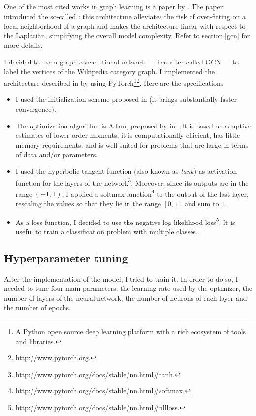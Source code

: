             One of the most cited works in graph learning is a paper by \citeauthor{Kipf} \cite{Kipf}. The paper introduced the so-called : this architecture alleviates the risk of over-fitting on a local neighborhood of a graph and makes the architecture linear with respect to the Laplacian, simplifying the overall model complexity. Refer to section \ref{gcn} for more details.
            
            I decided to use a graph convolutional network --- hereafter called GCN --- to label the vertices of the Wikipedia category graph. I implemented the architecture described in \cite{Kipf} by using PyTorch\footnote{A Python open source deep learning platform with a rich ecosystem of tools and libraries.}\footnote{\url{http://www.pytorch.org}.}. Here are the specifications:
            \begin{itemize}
                \item I used the initialization scheme proposed in \cite{Glorot} (it brings substantially faster convergence).
                \item The optimization algorithm is Adam, proposed by \citeauthor{Kingma} in \cite{Kingma}. It is based on adaptive estimates of lower-order moments, it is computationally efficient, has little memory requirements, and is well suited for problems that are large in terms of data and/or parameters.
                \item I used the hyperbolic tangent function (also known as \emph{tanh}) as activation function for the layers of the network\footnote{\url{http://www.pytorch.org/docs/stable/nn.html\#tanh}.}. Moreover, since its outputs are in the range \((-1,1)\), I applied a softmax function\footnote{\url{http://www.pytorch.org/docs/stable/nn.html\#softmax}.} to the output of the last layer, rescaling the values so that they lie in the range \([0,1]\) and sum to \(1\).
                \item As a loss function, I decided to use the negative log likelihood loss\footnote{\url{http://www.pytorch.org/docs/stable/nn.html\#nllloss}.}. It is useful to train a classification problem with multiple classes.
            \end{itemize}
        \subsection{Hyperparameter tuning}\label{experiment_tuning}
            After the implementation of the model, I tried to train it. In order to do so, I needed to tune four main parameters: the learning rate used by the optimizer, the number of layers of the neural network, the number of neurons of each layer and the number of epochs.
            
